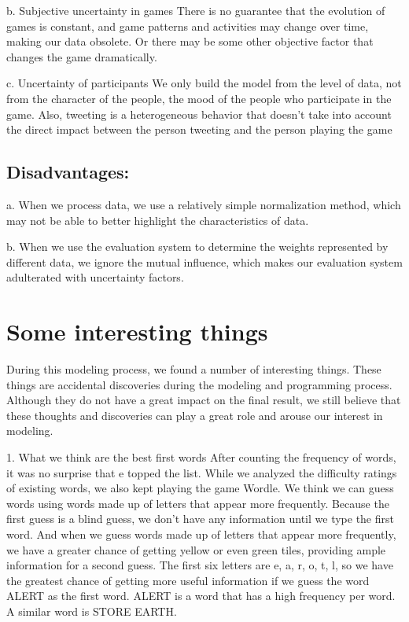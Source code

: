 \documentclass[12pt]{article}  %
\begin{document}
b. Subjective uncertainty in games
There is no guarantee that the evolution of games is constant, and game patterns and activities may change over time, making our data obsolete. Or there may be some other objective factor that changes the game dramatically.


c. Uncertainty of participants
We only build the model from the level of data, not from the character of the people, the mood of the people who participate in the game. Also, tweeting is a heterogeneous behavior that doesn't take into account the direct impact between the person tweeting and the person playing the game
\subsection{Disadvantages:}
a. When we process data, we use a relatively simple normalization method, which may not be able to better highlight the characteristics of data.


b. When we use the evaluation system to determine the weights represented by different data, we ignore the mutual influence, which makes our evaluation system adulterated with uncertainty factors.

\section{Some interesting things}
During this modeling process, we found a number of interesting things. These things are accidental discoveries during the modeling and programming process. Although they do not have a great impact on the final result, we still believe that these thoughts and discoveries can play a great role and arouse our interest in modeling.


1. What we think are the best first words
After counting the frequency of words, it was no surprise that e topped the list. While we analyzed the difficulty ratings of existing words, we also kept playing the game Wordle. We think we can guess words using words made up of letters that appear more frequently. Because the first guess is a blind guess, we don't have any information until we type the first word. And when we guess words made up of letters that appear more frequently, we have a greater chance of getting yellow or even green tiles, providing ample information for a second guess. The first six letters are e, a, r, o, t, l, so we have the greatest chance of getting more useful information if we guess the word ALERT as the first word. ALERT is a word that has a high frequency per word. A similar word is STORE EARTH.
\end{document}
